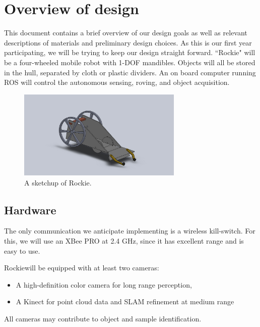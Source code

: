 \documentclass{paper}
\newcommand \robotName{Rockie} 		%
\begin{document}
\maketitle


\section*{Overview of design}

	This document contains a brief overview of our design goals as well as relevant descriptions of materials and preliminary design choices.  As this is our first year participating, we will be trying to keep our design straight forward.  ``\robotName" will be a four-wheeled mobile robot with 1-DOF mandibles.  Objects will all be stored in the hull, separated by cloth or plastic dividers.   An on board computer running ROS will control the autonomous sensing, roving, and object acquisition.   

\begin{figure}[h]
\centering
\includegraphics[width=0.7\textwidth]{fig/design.jpg}
\caption{A sketchup of \robotName. }
\label{fig:robotMockup}
\end{figure}

\subsection*{Hardware}

	The only communication we anticipate implementing is a wireless kill-switch.  For this, we will use an XBee PRO at 2.4 GHz, since it has excellent range and is easy to use.

	\robotName\text{ }will be equipped with at least two cameras: 
\begin{itemize}
	\item A high-definition color camera for long range perception, 
	\item A Kinect for point cloud data and SLAM refinement at medium range
\end{itemize}
All cameras may contribute to object and sample identification.  
\end{document}
